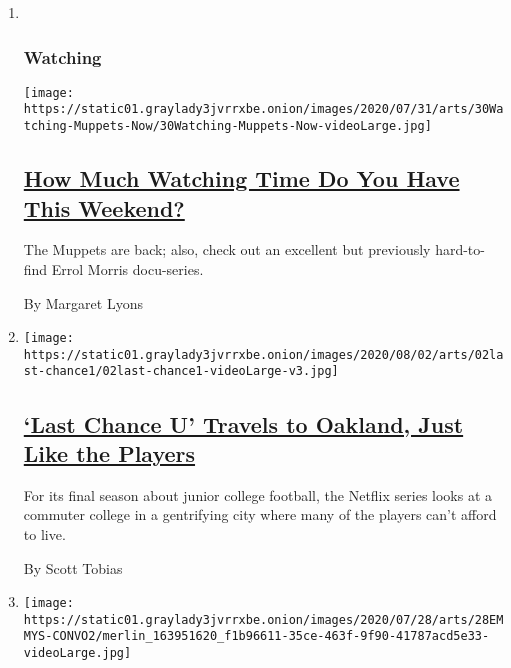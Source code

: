 \begin{enumerate}
\def\labelenumi{\arabic{enumi}.}
\item ~
  \hypertarget{watching}{%
  \subsubsection{Watching}\label{watching}}

  \texttt{[image: https://static01.graylady3jvrrxbe.onion/images/2020/07/31/arts/30Watching-Muppets-Now/30Watching-Muppets-Now-videoLarge.jpg]}

  \hypertarget{how-much-watching-time-do-you-have-this-weekend}{%
  \subsection{\texorpdfstring{\href{/2020/07/30/arts/television/muppets-disney-errol-morris-first-person.html}{How
  Much Watching Time Do You Have This
  Weekend?}}{How Much Watching Time Do You Have This Weekend?}}\label{how-much-watching-time-do-you-have-this-weekend}}

  The Muppets are back; also, check out an excellent but previously
  hard-to-find Errol Morris docu-series.

  By Margaret Lyons
\item
  \texttt{[image: https://static01.graylady3jvrrxbe.onion/images/2020/08/02/arts/02last-chance1/02last-chance1-videoLarge-v3.jpg]}

  \hypertarget{last-chance-u-travels-to-oakland-just-like-the-players}{%
  \subsection{\texorpdfstring{\href{/2020/07/28/arts/television/last-chance-u-season-5.html}{`Last
  Chance U' Travels to Oakland, Just Like the
  Players}}{`Last Chance U' Travels to Oakland, Just Like the Players}}\label{last-chance-u-travels-to-oakland-just-like-the-players}}

  For its final season about junior college football, the Netflix series
  looks at a commuter college in a gentrifying city where many of the
  players can't afford to live.

  By Scott Tobias
\item
  \texttt{[image: https://static01.graylady3jvrrxbe.onion/images/2020/07/28/arts/28EMMYS-CONVO2/merlin\_163951620\_f1b96611-35ce-463f-9f90-41787acd5e33-videoLarge.jpg]}

  \hypertarget{emmys-our-critics-on-watchmen-maisel-and-yes-tiger-king}{%
}
\end{enumerate}
